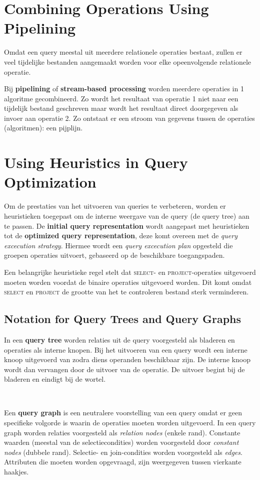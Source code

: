 \section{Combining Operations Using Pipelining}
Omdat een query meestal uit meerdere relationele operaties bestaat, zullen er veel tijdelijke bestanden aangemaakt worden voor elke opeenvolgende relationele operatie.

Bij \textbf{pipelining} of \textbf{stream-based processing} worden meerdere operaties in 1 algoritme gecombineerd. Zo wordt het resultaat van operatie 1 niet naar een tijdelijk bestand geschreven maar wordt het resultaat direct doorgegeven als invoer aan operatie 2. Zo ontstaat er een stroom van gegevens tussen de operaties (algoritmen): een pijplijn.



\section{Using Heuristics in Query Optimization}
Om de prestaties van het uitvoeren van queries te verbeteren, worden er heuristieken toegepast om de interne weergave van de query (de query tree) aan te passen. De \textbf{initial query representation} wordt aangepast met heuristieken tot de \textbf{optimized query representation}, deze komt overeen met de \textit{query excecution strategy}. Hiermee wordt een \textit{query excecution plan} opgesteld die groepen operaties uitvoert, gebaseerd op de beschikbare toegangspaden.

Een belangrijke heuristieke regel stelt dat \textsc{select}- en \textsc{project}-operaties uitgevoerd moeten worden voordat de binaire operaties uitgevoerd worden. Dit komt omdat \textsc{select} en \textsc{project} de grootte van het te controleren bestand sterk verminderen.


\subsection{Notation for Query Trees and Query Graphs}
In een \textbf{query tree} worden relaties uit de query voorgesteld als bladeren en operaties als interne knopen. Bij het uitvoeren van een query wordt een interne knoop uitgevoerd van zodra diens operanden beschikbaar zijn. De interne knoop wordt dan vervangen door de uitvoer van de operatie. De uitvoer begint bij de bladeren en eindigt bij de wortel.

~

\noindent Een \textbf{query graph} is een neutralere voorstelling van een query omdat er geen specifieke volgorde is waarin de operaties moeten worden uitgevoerd. In een query graph worden relaties voorgesteld als \textit{relation nodes} (enkele rand). Constante waarden (meestal van de selectiecondities) worden voorgesteld door \textit{constant nodes} (dubbele rand). Selectie- en join-condities worden voorgesteld als \textit{edges}. Attributen die moeten worden opgevraagd, zijn weergegeven tussen vierkante haakjes.


